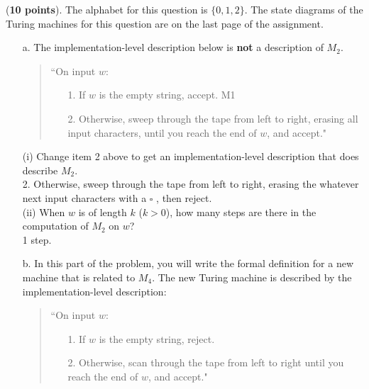 \documentclass[10pt,letterpaper,unboxed,cm]{hmcpset}
\begin{document}
\begin{problem}[2.]  ({\bf 10 points}). 
The alphabet for this question is $\{0,1,2\}$. The state diagrams of the Turing machines for this question are on the last page
of the assignment. 
\begin{itemize}
\item[a.] The implementation-level description below is {\bf not} a description of $M_2$.
\begin{quote}
``On input $w$:
\begin{itemize}
\item[1.] If $w$ is the empty string, accept.  
M1
\item[2.] Otherwise, sweep through the tape from left to right, erasing all input characters, until you reach the end of $w$, and accept."
\end{itemize}
\end{quote}
(i) Change item 2 above to get an implementation-level description that does describe $M_2$. \\
  \phantom{x}\hspace{5ex} 2. Otherwise, sweep through the tape from left to right, erasing the whatever next input characters with a $\square$ , then reject.\\

(ii) When $w$ is of length $k$ ($k >0$), how many steps are there in the computation of $M_2$ on $w$? \\
 \phantom{x}\hspace{5ex} 1 step. 


\item[b.] In this part of the problem, you will write the formal definition for a new machine that is related to $M_4.$
The new Turing machine is described by the  implementation-level description:
\begin{quote}
``On input $w$:
\begin{itemize}
\item[1.] If $w$ is the empty string, reject.  
\item[2.] Otherwise, scan through the tape from left to right until you reach the end of $w$, and accept."
\end{itemize}
\end{quote}


\end{itemize}
\end{problem}
\end{document}
